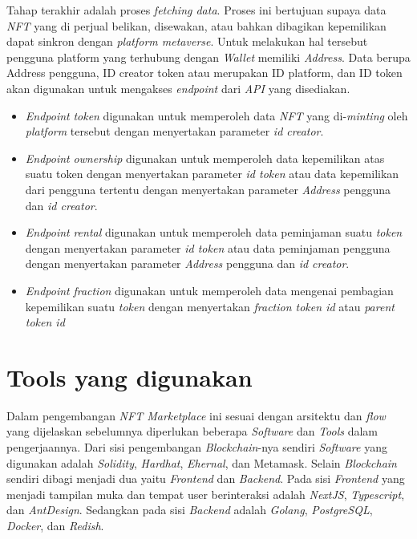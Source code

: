 Tahap terakhir adalah proses \emph{fetching data}. Proses ini bertujuan supaya data \emph{NFT} yang di perjual belikan, disewakan, atau bahkan dibagikan kepemilikan dapat sinkron dengan \emph{platform metaverse}. Untuk melakukan hal tersebut pengguna platform yang terhubung dengan \emph{Wallet} memiliki \emph{Address}. Data berupa Address pengguna, ID creator token atau merupakan ID platform, dan ID token akan digunakan untuk mengakses \emph{endpoint} dari \emph{API} yang disediakan.

\begin{itemize}
  \item \emph{Endpoint} \emph{token} digunakan untuk memperoleh data \emph{NFT} yang di-\emph{minting} oleh \emph{platform} tersebut dengan menyertakan parameter \emph{id creator}.
   \item \emph{Endpoint} \emph{ownership} digunakan untuk memperoleh data kepemilikan atas suatu token dengan menyertakan parameter \emph{id token} atau data kepemilikan dari pengguna tertentu dengan menyertakan parameter \emph{Address} pengguna dan \emph{id creator}.
  \item \emph{Endpoint} \emph{rental} digunakan untuk memperoleh data peminjaman suatu \emph{token} dengan menyertakan parameter \emph{id token} atau data peminjaman pengguna dengan menyertakan parameter \emph{Address} pengguna dan \emph{id creator}.
  \item \emph{Endpoint} \emph{fraction} digunakan untuk memperoleh data mengenai pembagian kepemilikan suatu \emph{token} dengan menyertakan \emph{fraction token id} atau \emph{parent token id}
\end{itemize}

\section{Tools yang digunakan}

Dalam pengembangan \emph{NFT Marketplace} ini sesuai dengan arsitektu dan \emph{flow} yang dijelaskan sebelumnya diperlukan beberapa \emph{Software} dan \emph{Tools} dalam pengerjaannya. Dari sisi pengembangan \emph{Blockchain}-nya sendiri \emph{Software} yang digunakan adalah \emph{Solidity}, \emph{Hardhat}, \emph{Ehernal}, dan Metamask. Selain \emph{Blockchain} sendiri dibagi menjadi dua yaitu \emph{Frontend} dan \emph{Backend}. Pada sisi \emph{Frontend} yang menjadi tampilan muka dan tempat user berinteraksi adalah \emph{NextJS}, \emph{Typescript}, dan \emph{AntDesign}. Sedangkan pada sisi \emph{Backend} adalah \emph{Golang}, \emph{PostgreSQL}, \emph{Docker}, dan \emph{Redish}.

